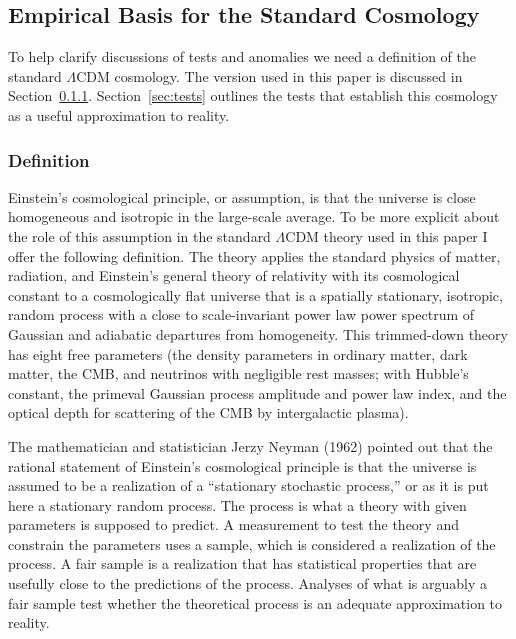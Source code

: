 \documentclass[fleqn,12pt]{article}
\begin{document}
\subsection{Empirical Basis for the Standard Cosmology}\label{sec:EmpiricalBasis}

To help clarify discussions of tests and anomalies we need a definition of the standard $\Lambda$CDM cosmology. The version used in this paper is discussed in Section~\ref{sec:definition}. Section~\ref{sec:tests} outlines the tests that establish this cosmology as a useful approximation to reality.

\subsubsection{Definition}\label{sec:definition}

Einstein's cosmological principle, or assumption, is that the universe is close homogeneous and isotropic in the large-scale average.  To be more explicit about the role of this assumption in the standard $\Lambda$CDM theory used in this paper I offer the following definition. The theory applies the standard physics of matter, radiation, and Einstein's general theory of relativity with its cosmological constant to a cosmologically flat universe that is a spatially stationary, isotropic,  random process with a close to scale-invariant power law power spectrum of  Gaussian and adiabatic departures from homogeneity.  This trimmed-down theory has eight free parameters (the density parameters in ordinary matter, dark matter, the CMB, and neutrinos with negligible rest masses; with  Hubble's constant, the primeval Gaussian process amplitude and power law index, and the optical depth for scattering of the CMB by intergalactic plasma). 

The mathematician and statistician Jerzy Neyman (1962) pointed out that the rational statement of Einstein's cosmological principle is that the universe is assumed to be a realization of a ``stationary stochastic process,'' or as it is put here a stationary random process. The process is what a theory with given parameters is supposed to predict. A measurement to test the theory and constrain the parameters uses a sample, which is considered a realization of the process. A fair sample is a realization that has statistical properties that are usefully close to the predictions of the process. Analyses of what is arguably a fair sample test whether the theoretical process is an adequate approximation to reality. 
\end{document}

